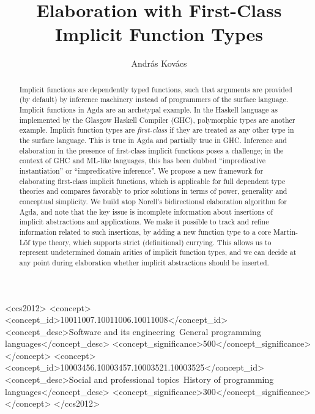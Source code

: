 \documentclass[acmsmall,review,anonymous]{acmart}\settopmatter{printfolios=true,printccs=false,printacmref=false}
\begin{document}
\title{Elaboration with First-Class Implicit Function Types}


\author{Andr{\'a}s Kov{\'a}cs}


\begin{abstract}
Implicit functions are dependently typed functions, such that arguments are
provided (by default) by inference machinery instead of programmers of the
surface language. Implicit functions in Agda are an archetypal example. In the
Haskell language as implemented by the Glasgow Haskell Compiler (GHC),
polymorphic types are another example. Implicit function types are
\emph{first-class} if they are treated as any other type in the surface
language. This is true in Agda and partially true in GHC. Inference and
elaboration in the presence of first-class implicit functions poses a challenge;
in the context of GHC and ML-like languages, this has been dubbed
``impredicative instantiation'' or ``impredicative inference''. We propose a new
framework for elaborating first-class implicit functions, which is applicable
for full dependent type theories and compares favorably to prior solutions in
terms of power, generality and conceptual simplicity. We build atop Norell's
bidirectional elaboration algorithm for Agda, and note that the key issue is
incomplete information about insertions of implicit abstractions and
applications. We make it possible to track and refine information related to
such insertions, by adding a new function type to a core Martin-L\"of type
theory, which supports strict (definitional) currying. This allows us to
represent undetermined domain arities of implicit function types, and we can
decide at any point during elaboration whether implicit abstractions should be
inserted.
\end{abstract}


\begin{CCSXML}
<ccs2012>
<concept>
<concept_id>10011007.10011006.10011008</concept_id>
<concept_desc>Software and its engineering~General programming languages</concept_desc>
<concept_significance>500</concept_significance>
</concept>
<concept>
<concept_id>10003456.10003457.10003521.10003525</concept_id>
<concept_desc>Social and professional topics~History of programming languages</concept_desc>
<concept_significance>300</concept_significance>
</concept>
</ccs2012>
\end{CCSXML}
\end{document}
